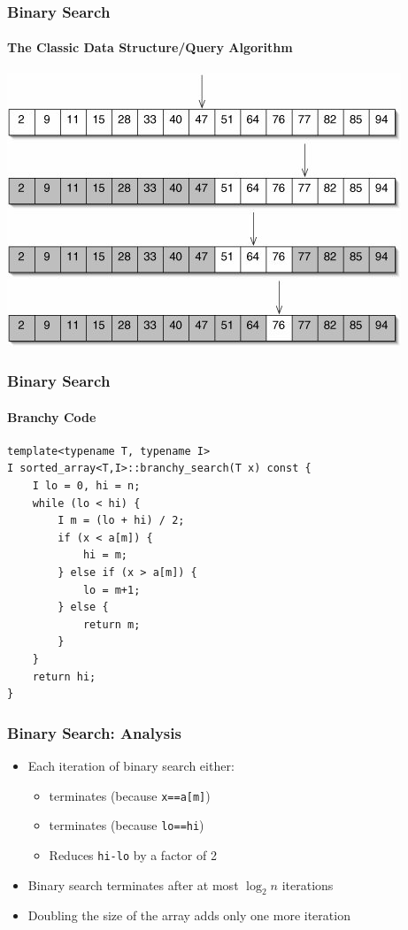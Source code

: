 \documentclass[xcolor=dvipsnames]{beamer}
\begin{document}
\begin{frame}
  \frametitle{Binary Search}
  \framesubtitle{The Classic Data Structure/Query Algorithm}

  \begin{center}
    \includegraphics[width=.9\textwidth]{images/binary-search}
  \end{center}

\end{frame}


\begin{frame}[fragile]
  \frametitle{Binary Search}
  \framesubtitle{Branchy Code}

{\small
\begin{verbatim}
template<typename T, typename I>
I sorted_array<T,I>::branchy_search(T x) const {
    I lo = 0, hi = n;
    while (lo < hi) {
        I m = (lo + hi) / 2;
        if (x < a[m]) {
            hi = m;
        } else if (x > a[m]) {
            lo = m+1;
        } else {
            return m;
        }
    }
    return hi;
}
\end{verbatim}
}
\end{frame}

\begin{frame}[fragile]
  \frametitle{Binary Search: Analysis}

  \begin{itemize}
    \item<+->Each iteration of binary search either:
    \begin{itemize}
      \item<+->terminates (because \texttt{x==a[m]})
      \item<+->terminates (because \texttt{lo==hi})
      \item<+->Reduces \texttt{hi-lo} by a factor of 2
    \end{itemize}
    \item<+->Binary search terminates after at most $\log_2 n$ iterations
    \item<+->Doubling the size of the array adds only one more iteration
  \end{itemize}
\end{frame}
\end{document}

